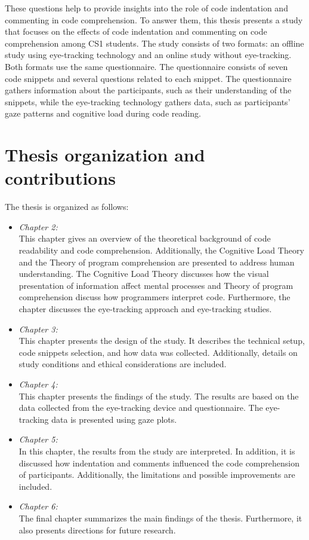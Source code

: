 These questions help to provide insights into the role of code indentation and commenting in code comprehension. 
To answer them, this thesis presents a study that focuses on the effects of code indentation and commenting on code comprehension among CS1 students.
The study consists of two formats: an offline study using eye-tracking technology and an online study without eye-tracking. Both formats use the same questionnaire. The questionnaire consists of seven code snippets and several questions related to each snippet. The questionnaire gathers information about the participants, such as their understanding of the snippets, while the eye-tracking technology gathers data, such as participants’ gaze patterns and cognitive load during code reading.  

\section{Thesis organization and contributions}

The thesis is organized as follows:
\begin{itemize}

\item[] \emph{Chapter 2:} 
\\This chapter gives an overview of the theoretical background of code readability and code comprehension. Additionally, the Cognitive Load Theory and the Theory of program comprehension are presented to address human understanding. The Cognitive Load Theory discusses how the visual presentation of information  affect mental processes and Theory of program comprehension discuss how programmers interpret code. 
Furthermore, the chapter discusses the eye-tracking approach and eye-tracking studies.  


\item[] \emph{Chapter 3:}
\\This chapter presents the design of the study. It describes the technical setup, code snippets selection, and how data was collected. Additionally, details on study conditions and ethical considerations are included.


\item[] \emph{Chapter 4:} 
\\ This chapter presents the findings of the study. The results are based on the data collected from the eye-tracking device and questionnaire. The eye-tracking data is presented using gaze plots.


\item[] \emph{Chapter 5:} 
\\In this chapter, the results from the study are interpreted. In addition, it is discussed how indentation and comments influenced the code comprehension of participants. Additionally, the limitations and possible improvements are included.

\item[] \emph{Chapter 6:} 
\\The final chapter summarizes the main findings of the thesis. Furthermore, it also presents directions for future research.

\end{itemize}


